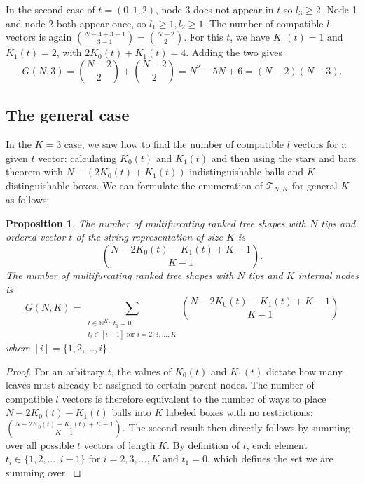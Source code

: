 \documentclass{article}
\newtheorem{proposition}[theorem]{Proposition}
\begin{document}
In the second case of $t=(0,1,2)$, node 3 does not appear in $t$ so $l_3 \geq 2$. Node 1 and node 2 both appear once, so $l_1\geq 1, l_2 \geq 1$. The number of compatible $l$ vectors is again $\binom{N-4+3-1}{3-1} = \binom{N-2}{2}$. For this $t$, we have $K_0(t)=1$ and $K_1(t)=2$, with $2K_0(t)+K_1(t)=4$. Adding the two gives \[ G(N, 3) =  \binom{N-2}{2} +  \binom{N-2}{2}= N^2-5N+6= (N-2)(N-3).\] 

\subsection{The general case}

In the $K=3$ case, we saw how to find the number of compatible $l$ vectors for a given $t$ vector: calculating $K_0(t)$ and $K_1(t)$ and then using the stars and bars theorem with $N-(2K_0(t)+K_1(t))$ indistinguishable balls and $K$ distinguishable boxes. We can formulate the enumeration of $\mathcal{T}_{N,K}$ for general $K$ as follows:

\begin{proposition} \label{prop:trees-per-string}
The number of multifurcating ranked tree shapes with $N$ tips and ordered vector $t$ of the string representation of size $K$ is 
\[\binom{N-2K_0(t) - K_1(t) + K-1}{K-1}.\] 
The number of multifurcating ranked tree shapes with $N$ tips and $K$ internal nodes is \[ G(N,K)= \sum_{\substack{t \in \mathbb{N}^K: \; t_1=0, \\ t_i \in [i-1] \text{ for } i=2,3,\ldots,K}} \binom{N-2K_0(t) - K_1(t) + K-1}{K-1} \] where $[i]=\{1,2,\ldots,i\}$. 
\end{proposition}
\begin{proof}
For an arbitrary $t$, the values of $K_0(t)$ and $K_1(t)$ dictate how many leaves must already be assigned to certain parent nodes. The number of compatible $l$ vectors is therefore equivalent to the number of ways to place $N-2K_0(t) - K_1(t)$ balls into $K$ labeled boxes with no restrictions: $\binom{N-2K_0(t) - K_1(t) + K-1}{K-1}$. The second result then directly follows by summing over all possible $t$ vectors of length $K$. By definition of $t$, each element $t_i \in \{1,2,\ldots,i-1\}$ for $i=2,3,\ldots,K$ and $t_1=0$, which defines the set we are summing over. 
\end{proof}
\end{document}
